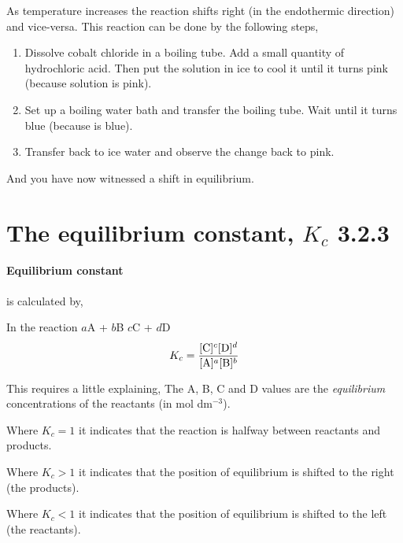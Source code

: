 	\begin{center}
	\end{center}
	As temperature increases the reaction shifts right (in the endothermic direction) and vice-versa. This reaction can be done by the following steps,
	
	\begin{enumerate}
		\item Dissolve cobalt chloride in a boiling tube. Add a small quantity of hydrochloric acid. Then put the solution in ice to cool it until it turns pink (because  solution is pink).
		\item Set up a boiling water bath and transfer the boiling tube. Wait until it turns blue (because  is blue).
		\item Transfer back to ice water and observe the change back to pink.
	\end{enumerate}
	And you have now witnessed a shift in equilibrium.
	
\section{The equilibrium constant, $K_c$ 3.2.3}

	\paragraph{Equilibrium constant} is calculated by,
	\begin{center}
		In the reaction $a$A + $b$B \ch{<=>} $c$C + $d$D
		\begin{equation}
			K_c = \frac{[\textnormal{C}]^c[\textnormal{D}]^d}{[\textnormal{A}]^a[\textnormal{B}]^b}
		\end{equation}
	\end{center}
	This requires a little explaining, The A, B, C and D values are the \textit{equilibrium} concentrations of the reactants (in mol dm$^{-3}$).
	
	Where $K_c = 1$ it indicates that the reaction is halfway between reactants and products.
	
	Where $K_c > 1$ it indicates that the position of equilibrium is shifted to the right (the products).
	
	Where $K_c < 1$ it indicates that the position of equilibrium is shifted to the left (the reactants).
	
